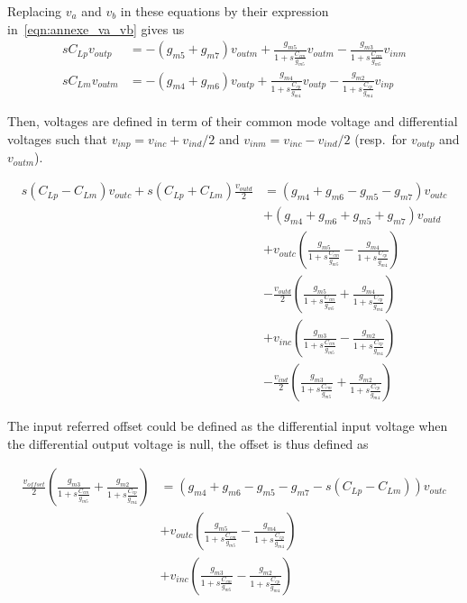 Replacing \(v_{a} \) and \(v_{b} \) in these equations by their expression in~\ref{eqn:annexe_va_vb} gives us
\begin{align}
    sC_{Lp} v_{outp} &= -(g_{m5}+g_{m7})v_{outm} + \frac{g_{m5}}{1+s\frac{C_{cm}}{g_{m5}}}v_{outm} - \frac{g_{m3}}{1+s\frac{C_{cm}}{g_{m5}}}v_{inm} \\
    sC_{Lm} v_{outm} &= -(g_{m4}+g_{m6})v_{outp} + \frac{g_{m4}}{1+s\frac{C_{cp}}{g_{m4}}}v_{outp} - \frac{g_{m2}}{1+s\frac{C_{cp}}{g_{m4}}}v_{inp}
\end{align}

Then, voltages are defined in term of their common mode voltage and differential voltages such that \(v_{inp} = v_{inc}+v_{ind}/2\) and \(v_{inm} = v_{inc}-v_{ind}/2\) (resp.\ for \(v_{outp}\) and \(v_{outm}\)).

\begin{align}
    s\left(C_{Lp}-C_{Lm}\right) v_{outc} + s\left(C_{Lp}+C_{Lm}\right) \frac{v_{outd}}{2} &= (g_{m4}+g_{m6}-g_{m5}-g_{m7}) v_{outc} \\
    &+ (g_{m4}+g_{m6}+g_{m5}+g_{m7}) v_{outd} \nonumber \\
    &+ v_{outc} \left(\frac{g_{m5}}{1+s\frac{C_{cm}}{g_{m5}}} - \frac{g_{m4}}{1+s\frac{C_{cp}}{g_{m4}}}\right) \nonumber \\
    &- \frac{v_{outd}}{2} \left(\frac{g_{m5}}{1+s\frac{C_{cm}}{g_{m5}}} + \frac{g_{m4}}{1+s\frac{C_{cp}}{g_{m4}}}\right) \nonumber \\
    &+ v_{inc} \left(\frac{g_{m3}}{1+s\frac{C_{cm}}{g_{m5}}} - \frac{g_{m2}}{1+s\frac{C_{cp}}{g_{m4}}}\right) \nonumber \\
    &- \frac{v_{ind}}{2} \left(\frac{g_{m3}}{1+s\frac{C_{cm}}{g_{m5}}} + \frac{g_{m2}}{1+s\frac{C_{cp}}{g_{m4}}}\right) \nonumber
\end{align}

The input referred offset could be defined as the differential input voltage when the differential output voltage is null, the offset is thus defined as

\begin{align}
    \frac{v_{offset}}{2} \left( \frac{g_{m3}}{1+s\frac{C_{cm}}{g_{m5}}} + \frac{g_{m2}}{1+s\frac{C_{cp}}{g_{m4}}} \right) &= \left( g_{m4}+g_{m6}-g_{m5}-g_{m7}-s\left(C_{Lp}-C_{Lm}\right) \right) v_{outc} \\
    &+ v_{outc} \left( \frac{g_{m5}}{1+s\frac{C_{cm}}{g_{m5}}} - \frac{g_{m4}}{1+s\frac{C_{cp}}{g_{m4}}} \right) \nonumber \\
    &+ v_{inc} \left( \frac{g_{m3}}{1+s\frac{C_{cm}}{g_{m5}}} - \frac{g_{m2}}{1+s\frac{C_{cp}}{g_{m4}}} \right) \nonumber
\end{align}

